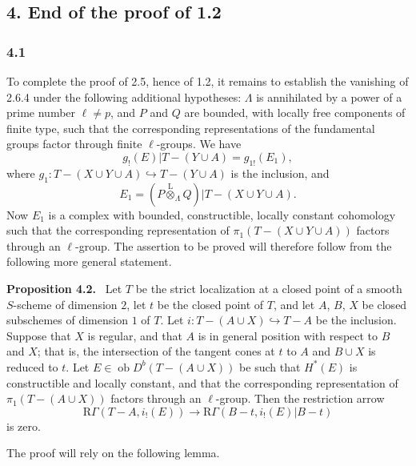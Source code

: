 \documentclass[11pt]{article}
\newenvironment{statement}[1]{\par\medskip\noindent\textbf{#1.}\ }{\par\medskip}
\providecommand{\lten}{\overset{\mathrm L}{\otimes}}
\providecommand{\Ob}{\operatorname{ob}}
\providecommand{\lten}{\overset{\mathrm L}{\otimes}}
\providecommand{\lten}{\overset{\mathrm L}{\otimes}}
\providecommand{\Ob}{\operatorname{ob}}
\providecommand{\lten}{\overset{\mathrm L}{\otimes}}
\providecommand{\lten}{\overset{\mathrm L}{\otimes}}
\providecommand{\Ob}{\operatorname{Ob}}
\providecommand{\lten}{\overset{\mathrm L}{\otimes}}
\begin{document}
\subsection*{4. End of the proof of 1.2}

\subsubsection*{4.1}
To complete the proof of 2.5, hence of 1.2, it remains to establish the vanishing of 2.6.4 under the following additional hypotheses: $\Lambda$ is annihilated by a power of a prime number $\ell\ne p$, and $P$ and $Q$ are bounded, with locally free components of finite type, such that the corresponding representations of the fundamental groups factor through finite $\ell$-groups. We have
\[
g_!(E)|T-(Y\cup A)=g_{1!}(E_1),
\]
where $g_1:T-(X\cup Y\cup A)\hookrightarrow T-(Y\cup A)$ is the inclusion, and
\[
E_1=(P\lten_{\Lambda}Q)|T-(X\cup Y\cup A).
\]
Now $E_1$ is a complex with bounded, constructible, locally constant cohomology such that the corresponding representation of $\pi_1(T-(X\cup Y\cup A))$ factors through an $\ell$-group. The assertion to be proved will therefore follow from the following more general statement.

\begin{statement}{Proposition 4.2}
Let $T$ be the strict localization at a closed point of a smooth $S$-scheme of dimension $2$, let $t$ be the closed point of $T$, and let $A$, $B$, $X$ be closed subschemes of dimension $1$ of $T$. Let $i:T-(A\cup X)\hookrightarrow T-A$ be the inclusion. Suppose that $X$ is regular, and that $A$ is in general position with respect to $B$ and $X$; that is, the intersection of the tangent cones at $t$ to $A$ and $B\cup X$ is reduced to $t$. Let $E\in\Ob D^b(T-(A\cup X))$ be such that $H^*(E)$ is constructible and locally constant, and that the corresponding representation of $\pi_1(T-(A\cup X))$ factors through an $\ell$-group. Then the restriction arrow
\[
\mathrm R\Gamma(T-A,i_!(E))
\longrightarrow
\mathrm R\Gamma(B-t,i_!(E)|B-t)
\]
is zero.
\end{statement}

The proof will rely on the following lemma.
\end{document}
